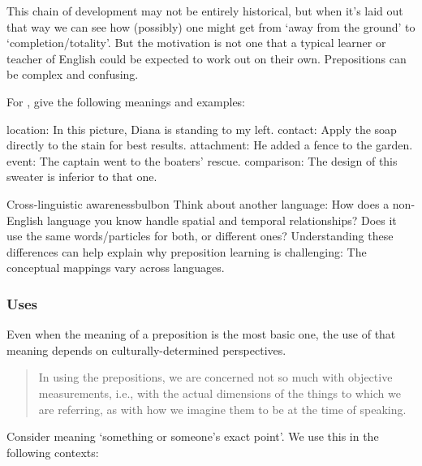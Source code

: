 This chain of development may not be entirely historical, but when it's laid out
that way we can see how (possibly) one might get from `away from the ground'
to `completion/totality'. But the motivation is not one that a typical learner or
teacher of English could be expected to work out on their own. Prepositions can
be complex and confusing.

For , \citet{tyler2003} give the following meanings and examples:

\ea \label{ex:to-meanings}
    \ea location: In this picture, Diana is standing to my left.
    \ex contact: Apply the soap directly to the stain for best results.
    \ex attachment: He added a fence to the garden.
    \ex event: The captain went to the boaters' rescue.
    \ex comparison: The design of this sweater is inferior to that one.
    \z
\z

\begin{tblsfilledsymbol}{Cross-linguistic awareness}{bulbon}
Think about another language: How does a non-English language you know handle spatial and temporal relationships? Does it use the same words/particles for both, or different ones? Understanding these differences can help explain why preposition learning is challenging: The conceptual mappings vary across languages.
\end{tblsfilledsymbol}

\subsubsection*{Uses}

Even when the meaning of a preposition is the most basic one, the use of that meaning depends on culturally-determined perspectives.

\begin{quote}
    In using the prepositions, we are concerned not so much with objective measurements, i.e., with the actual dimensions of the things to which we are referring, as with how we imagine them to be at the time of speaking. \citep{close1992}
\end{quote}

Consider  meaning `something or someone's exact point'. We use this  in the following contexts:

